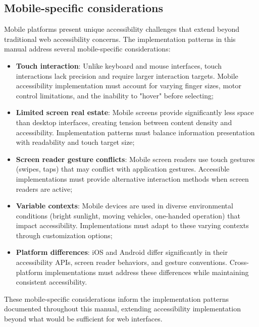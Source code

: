 \subsection{Mobile-specific considerations}
\label{subsec:mobile-considerations}

Mobile platforms present unique accessibility challenges that extend beyond traditional web accessibility concerns. The implementation patterns in this manual address several mobile-specific considerations:

\begin{itemize}
    \item \textbf{Touch interaction}: Unlike keyboard and mouse interfaces, touch interactions lack precision and require larger interaction targets. Mobile accessibility implementation must account for varying finger sizes, motor control limitations, and the inability to "hover" before selecting;
    
    \item \textbf{Limited screen real estate}: Mobile screens provide significantly less space than desktop interfaces, creating tension between content density and accessibility. Implementation patterns must balance information presentation with readability and touch target size;
    
    \item \textbf{Screen reader gesture conflicts}: Mobile screen readers use touch gestures (swipes, taps) that may conflict with application gestures. Accessible implementations must provide alternative interaction methods when screen readers are active;
    
    \item \textbf{Variable contexts}: Mobile devices are used in diverse environmental conditions (bright sunlight, moving vehicles, one-handed operation) that impact accessibility. Implementations must adapt to these varying contexts through customization options;
    
    \item \textbf{Platform differences}: iOS and Android differ significantly in their accessibility APIs, screen reader behaviors, and gesture conventions. Cross-platform implementations must address these differences while maintaining consistent accessibility.
\end{itemize}

These mobile-specific considerations inform the implementation patterns documented throughout this manual, extending accessibility implementation beyond what would be sufficient for web interfaces.

